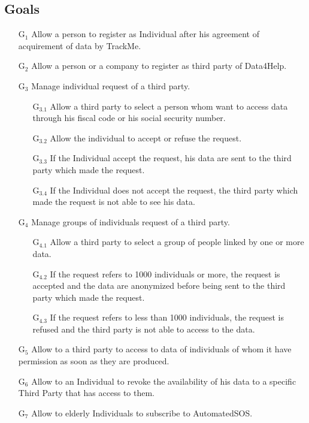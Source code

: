 \documentclass{report}
\newcommand{\subs}[1]{\ensuremath{_{\textrm{#1}}}}
\begin{document}
			\subsection{Goals}
			\begin{itemize}
				\item[G\subs{1}]Allow a person to register as Individual after his agreement of acquirement of data by TrackMe.
				
				\item[G\subs{2}]Allow a person or a company to register as third party of Data4Help.

				\item[G\subs{3}]Manage individual request of a third party.
					\begin{itemize}
					\item [G\subs{3.1}]	Allow a third party to select a person whom want to access data through his fiscal code or his social security number.
					\item [G\subs{3.2}]Allow the individual to accept or refuse the request.
					\item [G\subs{3.3}]If the Individual accept the request, his data are sent to the third party which made the request.
					\item [G\subs{3.4}]If the Individual does not accept the request, the third party which made the request is not able to see his data.
					\end{itemize}								
				\item [G\subs{4}]Manage groups of individuals request of a third party.\\
					\begin{itemize}
					\item [G\subs{4.1}]Allow a third party to select a group of people linked by one or more data.
					\item [G\subs{4.2}]If the request refers to 1000 individuals or more, the request is accepted and the data are anonymized before being sent to the third party which made the request.
					\item [G\subs{4.3}]If the request refers to less than 1000 individuals, the request is refused and the third party is not able to access to the data.
					\end{itemize}								
				\item[G\subs{5}]Allow to a third party to access to data of individuals of whom it have permission as soon as they are produced.
				\item[G\subs{6}]Allow to an Individual to revoke the availability of his data to a specific Third Party that has access to them.
				\item[G\subs{7}]Allow to elderly Individuals to subscribe to AutomatedSOS.
					

\end{itemize}
\end{document}
